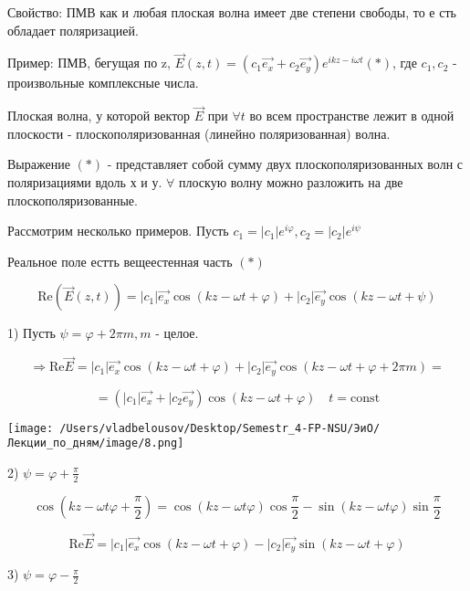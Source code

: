 \documentclass[12pt, a4paper]{report}
\begin{document}
\fi


Свойство: ПМВ как и любая плоская волна имеет две степени свободы, то е сть обладает поляризацией.

Пример: ПМВ, бегущая по z, \( \vec{E}( z,t)= ( c_1 \vec{e_x}+ c_2 \vec{e_y} )e^{ikz- i \omega t}  (*) \), где \( c_1, c_2 \) - произвольные комплексные числа.

\begin{definition}
    Плоская волна, у которой вектор \( \vec{E} \) при \( \forall t \) во всем пространстве лежит в одной плоскости - плоскополяризованная (линейно поляризованная) волна.
\end{definition}

Выражение \( (*) \) - представляет собой сумму двух плоскополяризованных волн с поляризациями вдоль х и у. \( \forall  \)  плоскую волну можно разложить на две плоскополяризованные.

Рассмотрим несколько примеров. Пусть \( c_1= |c_1|e^{i \varphi} , c_2= |c_2|e^{ i \psi }  \) 

Реальное поле естть вещеестенная часть \( (*) \) 

\[ \mathrm{Re} ( \vec{E}(z,t))= |c_1|\vec{e_x}\cos (kz - \omega t + \varphi) + |c_2|\vec{e_y}\cos (kz - \omega t + \psi)   \] 

1) Пусть \( \psi = \varphi + 2 \pi m, m  \) - целое. 

\[ \Rightarrow \mathrm{Re}\vec{E }= |c_1|\vec{e_x}\cos (kz - \omega t + \varphi) + |c_2|\vec{e_y}\cos (kz - \omega t + \varphi + 2 \pi m)=   \]

\[= (|c_1| \vec{e_x} + |c_2\vec{e_y}) \cos (kz - \omega t + \varphi ) \quad  t = \mathrm{const}    \] 

\begin{center}
    \texttt{[image: /Users/vladbelousov/Desktop/Semestr\_4-FP-NSU/ЭиО/Лекции\_по\_дням/image/8.png]}
\end{center}

2) \(\displaystyle  \psi = \varphi +\frac{\pi}{2}    \) 

\[ \cos  ( kz - \omega t \varphi+ \frac{\pi}{2} )= \cos( kz - \omega t \varphi)\cos \frac{\pi}{2}-\sin( kz - \omega t \varphi)\sin  \frac{\pi}{2}   \] 

\[ \mathrm{Re}\vec{E }= |c_1|\vec{e_x}\cos ( kz - \omega t + \varphi)  - |c_2|\vec{e_y}\sin( kz - \omega t + \varphi)   \] 

3) \( \displaystyle \psi=\varphi - \frac{\pi}{2}  \) 
\end{document}

